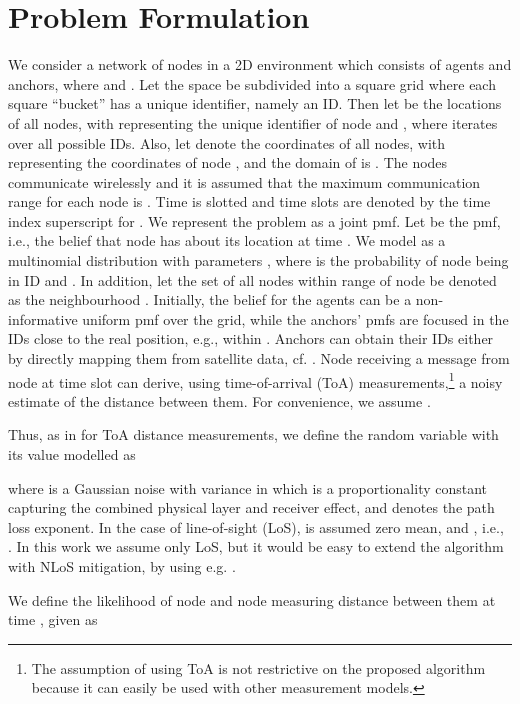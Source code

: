 \documentclass[10pt, final, journal]{IEEEtran}
\begin{document}
\section{Problem Formulation}\label{problemformulation}
We consider a network of nodes in a 2D environment which consists of  agents and  anchors, where  and .  Let the space be subdivided into a square grid where each square ``bucket'' has a unique identifier, namely an ID. Then let  be the locations of all nodes,  with  representing the unique identifier of node  and , where  iterates over all possible IDs. Also, let  denote the coordinates of all nodes, with  representing the coordinates of node ,  and the domain of  is .
The nodes communicate wirelessly and it is assumed that the maximum communication range for each node is . Time is slotted and time slots are denoted by the time index superscript  for . We represent the problem as a joint pmf. Let  be the pmf, i.e., the belief that node  has about its location at time .  We model    as a multinomial distribution with parameters , where  is the probability of node  being in ID  and . In addition, let the set of all nodes   within range of node  be denoted as the  neighbourhood . Initially, the  belief for the agents can be a non-informative uniform pmf over the grid, while the anchors' pmfs are focused in the IDs close to the real position, e.g., within . Anchors can obtain their IDs either by directly mapping them from satellite data, cf. \cite{ngamgrs}. Node  receiving a message from node  at time slot  can derive, using time-of-arrival (ToA) measurements,\footnote{The assumption of using ToA is not restrictive on the proposed algorithm because it can easily be used with other measurement models.} a noisy estimate  of the distance between them. For convenience, we assume .

Thus, as in \cite{Buehrer:2010ew} for ToA distance measurements, we define the random variable  with its value  modelled as

where  is a Gaussian noise with variance  in which  is a proportionality constant capturing the combined physical layer and receiver effect, and  denotes the path loss exponent. In the case of line-of-sight (LoS),  is assumed zero mean, and , i.e., . In this work we assume only LoS, but it would be easy to extend the algorithm with NLoS mitigation, by using e.g. \cite{oikonomou2011hybrid,Yin:2015}.

We define the likelihood of node  and node  measuring distance  between them at time , given  as
\end{document}

